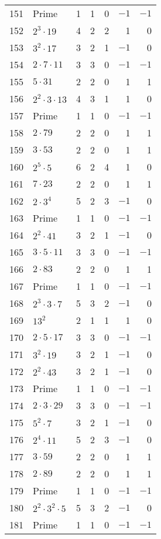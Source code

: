 \documentclass[12pt]{article}
\begin{document}
\begin{tabular}{|r|l|r|r|r|r|r|}
151 & Prime & 1 & 1 & 0 & $-1$ & $-1$ \\
152 & $2^3 \cdot 19$ & 4 & 2 & 2 & 1 & 0 \\
153 & $3^2 \cdot 17$ & 3 & 2 & 1 & $-1$ & 0 \\
154 & $2 \cdot 7 \cdot 11$ & 3 & 3 & 0 & $-1$ & $-1$ \\
155 & $5 \cdot 31$ & 2 & 2 & 0 & 1 & 1 \\
156 & $2^2 \cdot 3 \cdot 13$ & 4 & 3 & 1 & 1 & 0 \\
157 & Prime & 1 & 1 & 0 & $-1$ & $-1$ \\
158 & $2 \cdot 79$ & 2 & 2 & 0 & 1 & 1 \\
159 & $3 \cdot 53$ & 2 & 2 & 0 & 1 & 1 \\
160 & $2^5 \cdot 5$ & 6 & 2 & 4 & 1 & 0 \\
161 & $7 \cdot 23$ & 2 & 2 & 0 & 1 & 1 \\
162 & $2 \cdot 3^4$ & 5 & 2 & 3 & $-1$ & 0 \\
163 & Prime & 1 & 1 & 0 & $-1$ & $-1$ \\
164 & $2^2 \cdot 41$ & 3 & 2 & 1 & $-1$ & 0 \\
165 & $3 \cdot 5 \cdot 11$ & 3 & 3 & 0 & $-1$ & $-1$ \\
166 & $2 \cdot 83$ & 2 & 2 & 0 & 1 & 1 \\
167 & Prime & 1 & 1 & 0 & $-1$ & $-1$ \\
168 & $2^3 \cdot 3 \cdot 7$ & 5 & 3 & 2 & $-1$ & 0 \\
169 & $13^2$ & 2 & 1 & 1 & 1 & 0 \\
170 & $2 \cdot 5 \cdot 17$ & 3 & 3 & 0 & $-1$ & $-1$ \\
171 & $3^2 \cdot 19$ & 3 & 2 & 1 & $-1$ & 0 \\
172 & $2^2 \cdot 43$ & 3 & 2 & 1 & $-1$ & 0 \\
173 & Prime & 1 & 1 & 0 & $-1$ & $-1$ \\
174 & $2 \cdot 3 \cdot 29$ & 3 & 3 & 0 & $-1$ & $-1$ \\
175 & $5^2 \cdot 7$ & 3 & 2 & 1 & $-1$ & 0 \\
176 & $2^4 \cdot 11$ & 5 & 2 & 3 & $-1$ & 0 \\
177 & $3 \cdot 59$ & 2 & 2 & 0 & 1 & 1 \\
178 & $2 \cdot 89$ & 2 & 2 & 0 & 1 & 1 \\
179 & Prime & 1 & 1 & 0 & $-1$ & $-1$ \\
180 & $2^2 \cdot 3^2 \cdot 5$ & 5 & 3 & 2 & $-1$ & 0 \\
181 & Prime & 1 & 1 & 0 & $-1$ & $-1$ \\

\end{tabular}
\end{document}
